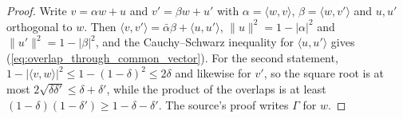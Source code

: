\begin{proof}
    \leanok
    Write $v=\alpha w+u$ and $v'=\beta w+u'$ with
    $\alpha=\langle w,v\rangle$, $\beta=\langle w,v'\rangle$ and $u,u'$
    orthogonal to $w$. Then
    $\langle v,v'\rangle=\bar\alpha\beta+\langle u,u'\rangle$,
    $\lVert u\rVert^2=1-\lvert\alpha\rvert^2$ and
    $\lVert u'\rVert^2=1-\lvert\beta\rvert^2$, and the Cauchy--Schwarz
    inequality for $\langle u,u'\rangle$ gives
    (\ref{eq:overlap_through_common_vector}). For the second statement,
    $1-\lvert\langle v,w\rangle\rvert^2\le1-(1-\delta)^2\le2\delta$ and
    likewise for $v'$, so the square root is at most
    $2\sqrt{\delta\delta'}\le\delta+\delta'$, while the product of the overlaps
    is at least $(1-\delta)(1-\delta')\ge1-\delta-\delta'$. The source's proof
    writes $\Gamma$ for $w$.
\end{proof}
